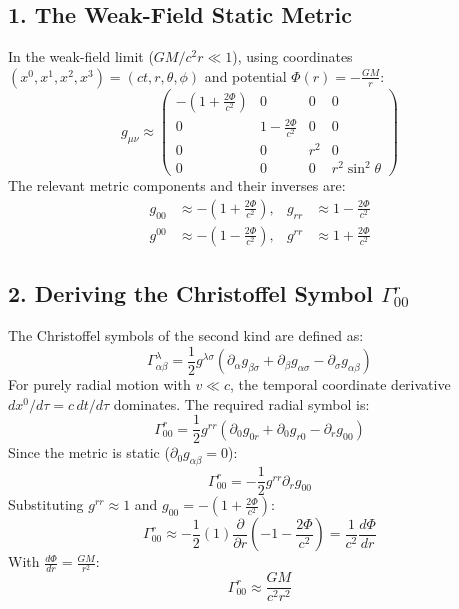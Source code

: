\documentclass{article}
\begin{document}
	\subsection*{1. The Weak-Field Static Metric}
	In the weak-field limit ($GM / c^2 r \ll 1$), using coordinates $(x^0, x^1, x^2, x^3) = (ct, r, \theta, \phi)$ and potential $\Phi(r) = -\frac{GM}{r}$:
	\begin{equation}
		g_{\mu\nu} \approx \begin{pmatrix} 
			-\left(1 + \frac{2\Phi}{c^2}\right) & 0 & 0 & 0 \\
			0 & 1 - \frac{2\Phi}{c^2} & 0 & 0 \\
			0 & 0 & r^2 & 0 \\
			0 & 0 & 0 & r^2 \sin^2\theta
		\end{pmatrix}
	\end{equation}
	The relevant metric components and their inverses are:
	\begin{align}
		g_{00} &\approx -\left(1 + \frac{2\Phi}{c^2}\right), & g_{rr} &\approx 1 - \frac{2\Phi}{c^2} \\
		g^{00} &\approx -\left(1 - \frac{2\Phi}{c^2}\right), & g^{rr} &\approx 1 + \frac{2\Phi}{c^2}
	\end{align}
	
	\subsection*{2. Deriving the Christoffel Symbol $\Gamma^r_{00}$}
	The Christoffel symbols of the second kind are defined as:
	\begin{equation}
		\Gamma^\lambda_{\alpha\beta} = \frac{1}{2} g^{\lambda\sigma} \left( \partial_\alpha g_{\beta\sigma} + \partial_\beta g_{\alpha\sigma} - \partial_\sigma g_{\alpha\beta} \right)
	\end{equation}
	For purely radial motion with $v \ll c$, the temporal coordinate derivative $dx^0/d\tau = c \, dt/d\tau$ dominates. The required radial symbol is:
	\begin{equation}
		\Gamma^r_{00} = \frac{1}{2} g^{rr} \left( \partial_0 g_{0r} + \partial_0 g_{r0} - \partial_r g_{00} \right)
	\end{equation}
	Since the metric is static ($\partial_0 g_{\alpha\beta} = 0$):
	\begin{equation}
		\Gamma^r_{00} = -\frac{1}{2} g^{rr} \partial_r g_{00}
	\end{equation}
	Substituting $g^{rr} \approx 1$ and $g_{00} = -\left(1 + \frac{2\Phi}{c^2}\right)$:
	\begin{equation}
		\Gamma^r_{00} \approx -\frac{1}{2} (1) \frac{\partial}{\partial r} \left( -1 - \frac{2\Phi}{c^2} \right) = \frac{1}{c^2} \frac{d\Phi}{dr}
	\end{equation}
	With $\frac{d\Phi}{dr} = \frac{GM}{r^2}$:
	\begin{equation}
		\Gamma^r_{00} \approx \frac{GM}{c^2 r^2}
	\end{equation}
	
\end{document}
